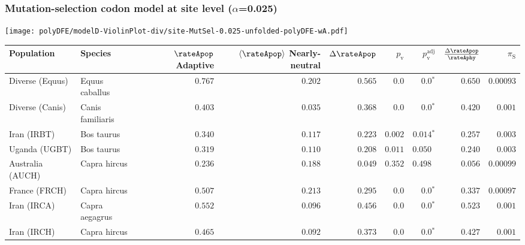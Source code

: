 \subsubsection*{Mutation-selection codon model at site level ($\alpha$=0.025)}
\begin{center}
    \texttt{[image: polyDFE/modelD-ViolinPlot-div/site-MutSel-0.025-unfolded-polyDFE-wA.pdf]}
    \begin{adjustbox}{width = 1\textwidth}
        \begin{tabular}{|l|l|r|r|r|r|r|r|r|}
            \toprule
            Population & Species & \specialcell{$\rateApop$ \\ Adaptive}                & \specialcell{$\left< \rateApop \right>$ \\ Nearly-neutral}                & $\Delta \rateApop $    & $p_{\mathrm{v}}$ & $p_{\mathrm{v}}^{\mathrm{adj}}$ & $\frac{\Delta\rateApop}{\rateAphy}$ & $\pi_{\textrm{S}}$    \\
            \midrule
            Diverse (Equus)                    & Equus caballus          & $ 0.767$ & $ 0.202$ & $ 0.565$ & $0.0$ & $\bm{0.0{^*}}$ & $ 0.650$ & $0.00093$ \\
            Diverse (Canis)                  & Canis familiaris          & $ 0.403$ & $ 0.035$ & $ 0.368$ & $0.0$ & $\bm{0.0{^*}}$        & $ 0.420$ & $ 0.001$ \\
            Iran (IRBT)               & Bos taurus        & $ 0.340$ & $ 0.117$ & $ 0.223$ & $ 0.002$ & $\bm{ 0.014{^*}}$        & $ 0.257$ & $ 0.003$ \\
            Uganda (UGBT)                  & Bos taurus        & $ 0.319$ & $ 0.110$ & $ 0.208$ & $ 0.011$    & $ 0.050~~$    & $ 0.240$ & $ 0.003$ \\
            Australia (AUCH)                    & Capra hircus      & $ 0.236$ & $ 0.188$ & $ 0.049$ & $ 0.352$    & $ 0.498~~$    & $ 0.056$ & $0.00099$ \\
            France (FRCH)                    & Capra hircus        & $ 0.507$ & $ 0.213$ & $ 0.295$ & $0.0$    & $\bm{0.0{^*}}$    & $ 0.337$ & $0.00097$ \\
            Iran (IRCA)                   & Capra aegagrus        & $ 0.552$ & $ 0.096$ & $ 0.456$ & $0.0$ & $\bm{0.0{^*}}$        & $ 0.523$ & $ 0.001$ \\
            Iran (IRCH)                 & Capra hircus        & $ 0.465$ & $ 0.092$ & $ 0.373$ & $0.0$    & $\bm{0.0{^*}}$    & $ 0.427$ & $ 0.001$ \\

\end{tabular}
\end{adjustbox}
\end{center}
